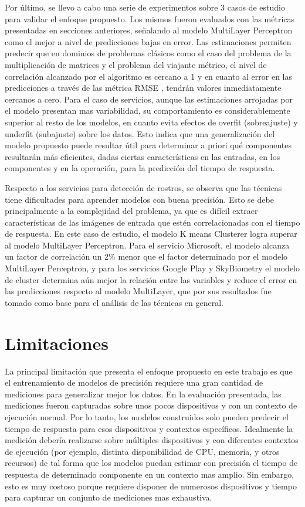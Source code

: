 Por último, se llevo a cabo una serie de experimentos sobre 3 casos
de estudio para validar el enfoque propuesto. Los mismos fueron evaluados
con las métricas presentadas en secciones anteriores, señalando al
modelo MultiLayer Perceptron como el mejor a nivel de predicciones
bajas en error. Las estimaciones permiten predecir que en dominios
de problemas clásicos como el caso del problema de la multiplicación
de matrices y el problema del viajante métrico, el nivel de correlación
alcanzado por el algoritmo es cercano a 1 y en cuanto al error en
las predicciones a través de las métrica \ac{RMSE} , tendrán valores
inmediatamente cercanos a cero. Para el caso de servicios, aunque
las estimaciones arrojadas por el modelo presentan mas variabilidad,
su comportamiento es considerablemente superior al resto de los modelos,
en cuanto evita efectos de overfit (sobreajuste) y underfit (subajuste)
sobre los datos. Esto indica que una generalización del modelo propuesto
puede resultar útil para determinar a priori qué componentes resultarán
más eficientes, dadas ciertas características en las entradas, en
los componentes y en la operación, para la predicción del tiempo de
respuesta.

Respecto a los servicios para detección de rostros, se observa que
las técnicas tiene dificultades para aprender modelos con buena precisión.
Esto se debe principalmente a la complejidad del problema, ya que
es difícil extraer características de las imágenes de entrada que
estén correlacionadas con el tiempo de respuesta. En este caso de
estudio, el modelo K means Clusterer logra superar  al modelo MultiLayer
Perceptron. Para el servicio Microsoft, el modelo alcanza un factor
de correlación un 2\% menor que el factor determinado por el modelo
MultiLayer Perceptron, y para los servicios Google Play y SkyBiometry
 el modelo de cluster determina aún mejor la relación entre las variables
y reduce el error en las predicciones respecto al modelo MultiLayer,
que por sus resultados fue tomado como base para el análisis de las
técnicas en general. 


\section{Limitaciones}

La principal limitación que presenta el enfoque propuesto en este
trabajo es que el entrenamiento de modelos de precisión requiere una
gran cantidad de mediciones para generalizar mejor los datos. En la
evaluación presentada, las mediciones fueron capturadas sobre unos
pocos dispositivos y con un contexto de ejecución normal. Por lo tanto,
los modelos construidos solo pueden predecir el tiempo de respuesta
para esos dispositivos y contextos específicos. Idealmente la medición
debería realizarse sobre múltiples dispositivos y con diferentes contextos
de ejecución (por ejemplo, distinta disponibilidad de CPU, memoria,
y otros recursos) de tal forma que los modelos puedan estimar con
precisión el tiempo de respuesta de determinado componente en un contexto
mas amplio. Sin embargo, esto es muy costoso porque requiere disponer
de numerosos dispositivos y tiempo para capturar un conjunto de mediciones
mas exhaustiva.

